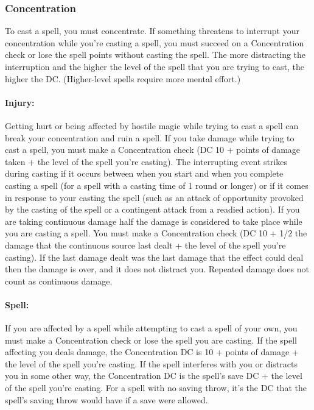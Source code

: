 \subsubsection{Concentration}
To cast a spell, you must concentrate. If something threatens to interrupt your concentration while you're casting a spell, 
you must succeed on a Concentration check or lose the spell points without casting the spell. 
The more distracting the interruption and the higher the level of the spell that you are trying to cast, the higher the DC. 
(Higher-level spells require more mental effort.)

\paragraph{Injury:} Getting hurt or being affected by hostile magic while trying to cast a spell can break your concentration and ruin a spell. 
If you take damage while trying to cast a spell, 
you must make a Concentration check (DC 10 + points of damage taken + the level of the spell you're casting). 
The interrupting event strikes during casting if it occurs between when you start and when you complete casting a spell 
(for a spell with a casting time of 1 round or longer) 
or if it comes in response to your casting the spell 
(such as an attack of opportunity provoked by the casting of the spell or a contingent attack from a readied action).
If you are taking continuous damage half the damage is considered to take place while you are casting a spell. 
You must make a Concentration check (DC 10 + 1/2 the damage that the continuous source last dealt + the level of the spell you're casting).
If the last damage dealt was the last damage that the effect could deal then the damage is over, and it does not distract you.
Repeated damage does not count as continuous damage.

\paragraph{Spell:} If you are affected by a spell while attempting to cast a spell of your own, 
you must make a Concentration check or lose the spell you are casting. 
If the spell affecting you deals damage, the Concentration DC is 10 + points of damage + the level of the spell you're casting. 
If the spell interferes with you or distracts you in some other way, 
the Concentration DC is the spell's save DC + the level of the spell you're casting. 
For a spell with no saving throw, it's the DC that the spell's saving throw would have if a save were allowed.

